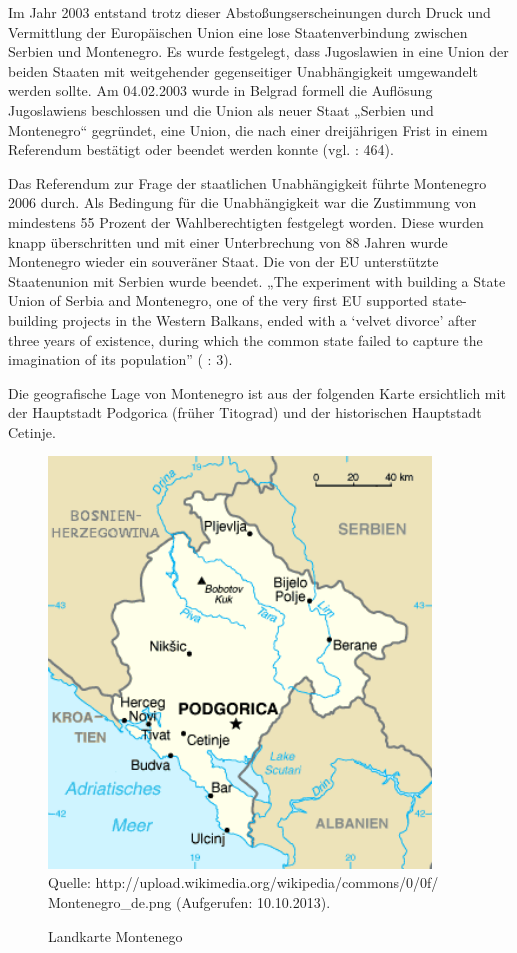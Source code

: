 Im Jahr 2003 entstand trotz dieser Abstoßungserscheinungen durch Druck und Vermittlung der Europäischen Union eine lose Staatenverbindung zwischen Serbien und Montenegro. Es wurde festgelegt, dass Jugoslawien in eine Union der beiden Staaten mit weitgehender gegenseitiger Unabhängigkeit umgewandelt werden sollte. Am 04.02.2003 wurde in Belgrad formell die Auflösung Jugoslawiens beschlossen und die Union als neuer Staat „Serbien und Montenegro“ gegründet, eine Union, die nach einer dreijährigen Frist in einem Referendum bestätigt oder beendet werden konnte (vgl. \cite{hoenehhol} : 464).\par
Das Referendum zur Frage der staatlichen Unabhängigkeit führte Montenegro 2006 durch. Als Bedingung für die Unabhängigkeit war die Zustimmung von mindestens 55 Prozent der Wahlberechtigten festgelegt worden. Diese wurden knapp überschritten und mit einer Unterbrechung von 88 Jahren wurde Montenegro wieder ein souveräner Staat. Die von der EU unterstützte Staatenunion mit Serbien wurde beendet. „The experiment with building a State Union of Serbia and Montenegro, one of the very first EU supported state-building projects in the Western Balkans, ended with a ‘velvet divorce’ after three years of existence, during which the common state failed to capture the imagination of its population” (\cite{noutcheva} : 3).\par
Die geografische Lage von Montenegro ist aus der folgenden Karte ersichtlich mit der Hauptstadt Podgorica (früher Titograd) und der historischen Hauptstadt Cetinje.
\begin{figure}[H]

  \centering
   \caption{Landkarte Montenego}
  \includegraphics[width=4in]{Material/Montenegro_de}\\
 Quelle: http://upload.wikimedia.org/wikipedia/commons/0/0f/\\
Montenegro\_de.png (Aufgerufen: 10.10.2013).
\end{figure}


